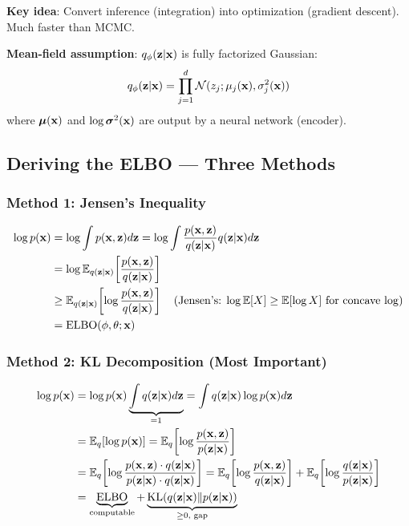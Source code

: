 \textbf{Key idea}: Convert inference (integration) into optimization (gradient descent). Much faster than MCMC.

\textbf{Mean-field assumption}: $q_\phi(\mathbf{z}|\mathbf{x})$ is fully factorized Gaussian:
$$q_\phi(\mathbf{z}|\mathbf{x}) = \prod_{j=1}^d \mathcal{N}(z_j; \mu_j(\mathbf{x}), \sigma_j^2(\mathbf{x}))$$
where $\boldsymbol{\mu}(\mathbf{x})$ and $\log\boldsymbol{\sigma}^2(\mathbf{x})$ are output by a neural network (encoder).

\subsection{Deriving the ELBO — Three Methods}

\subsubsection{Method 1: Jensen's Inequality}
\begin{align}
\log p(\mathbf{x}) &= \log \int p(\mathbf{x}, \mathbf{z}) d\mathbf{z} = \log \int \frac{p(\mathbf{x},\mathbf{z})}{q(\mathbf{z}|\mathbf{x})} q(\mathbf{z}|\mathbf{x}) d\mathbf{z} \nonumber\\
&= \log \mathbb{E}_{q(\mathbf{z}|\mathbf{x})}\!\left[\frac{p(\mathbf{x},\mathbf{z})}{q(\mathbf{z}|\mathbf{x})}\right] \nonumber\\
&\geq \mathbb{E}_{q(\mathbf{z}|\mathbf{x})}\!\left[\log\frac{p(\mathbf{x},\mathbf{z})}{q(\mathbf{z}|\mathbf{x})}\right] \quad \text{(Jensen's: $\log\mathbb{E}[X] \geq \mathbb{E}[\log X]$ for concave $\log$)} \nonumber\\
&= \text{ELBO}(\phi, \theta; \mathbf{x})
\end{align}

\subsubsection{Method 2: KL Decomposition (Most Important)}
\begin{align}
\log p(\mathbf{x}) &= \log p(\mathbf{x}) \underbrace{\int q(\mathbf{z}|\mathbf{x}) d\mathbf{z}}_{=1} = \int q(\mathbf{z}|\mathbf{x}) \log p(\mathbf{x}) d\mathbf{z} \nonumber\\
&= \mathbb{E}_q[\log p(\mathbf{x})] = \mathbb{E}_q\!\left[\log\frac{p(\mathbf{x},\mathbf{z})}{p(\mathbf{z}|\mathbf{x})}\right] \nonumber\\
&= \mathbb{E}_q\!\left[\log\frac{p(\mathbf{x},\mathbf{z}) \cdot q(\mathbf{z}|\mathbf{x})}{p(\mathbf{z}|\mathbf{x}) \cdot q(\mathbf{z}|\mathbf{x})}\right] = \mathbb{E}_q\!\left[\log\frac{p(\mathbf{x},\mathbf{z})}{q(\mathbf{z}|\mathbf{x})}\right] + \mathbb{E}_q\!\left[\log\frac{q(\mathbf{z}|\mathbf{x})}{p(\mathbf{z}|\mathbf{x})}\right] \nonumber\\
&= \underbrace{\text{ELBO}}_{\text{computable}} + \underbrace{\text{KL}(q(\mathbf{z}|\mathbf{x})\|p(\mathbf{z}|\mathbf{x}))}_{\geq 0, \text{ gap}}
\end{align}

